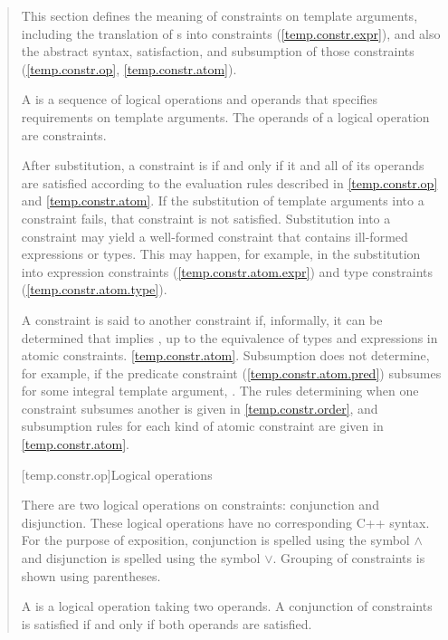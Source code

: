 \begin{quote}

\pnum
\enternote
This section defines the meaning of constraints on template arguments, including
the translation of s
into constraints (\ref{temp.constr.expr}),
and also the abstract syntax, satisfaction, and subsumption of those 
constraints (\ref{temp.constr.op}, \ref{temp.constr.atom}).
\exitnote

\pnum
A  is a sequence of logical operations and 
operands that specifies requirements on template arguments.
\enternote The operands of a logical operation are constraints. \exitnote

\pnum
After substitution, a constraint is  if and only if 
it and all of its operands are satisfied according to the evaluation 
rules described in \ref{temp.constr.op} and \ref{temp.constr.atom}.
% 
If the substitution of template arguments into a constraint fails, 
that constraint is not satisfied.
% 
\enternote
Substitution into a constraint may yield a well-formed constraint that
contains ill-formed expressions or types. This may happen, for
example, in the substitution into expression constraints
(\ref{temp.constr.atom.expr}) and type constraints
(\ref{temp.constr.atom.type}).
\exitnote

\pnum
A constraint  is said to  another constraint  
if, informally, it can be determined that  implies , up to 
the equivalence of types and expressions in atomic constraints.
\ref{temp.constr.atom}. 
% 
\enternote
Subsumption does not determine, for example, if the predicate 
constraint (\ref{temp.constr.atom.pred}) 
 subsumes  for 
some integral template argument, . 
\exitnote
% 
The rules determining when one constraint subsumes another is given
in \ref{temp.constr.order}, and subsumption
rules for each kind of atomic constraint are given in
\ref{temp.constr.atom}.


[temp.constr.op]{Logical operations}

\pnum
There are two logical operations on constraints: conjunction
and disjunction.
% 
\enternote 
These logical operations have no corresponding C++ syntax.
For the purpose of exposition, conjunction is spelled
using the symbol $\land$ and disjunction is spelled using the 
symbol $\lor$. Grouping of constraints is shown using parentheses.
\exitnote

\pnum
A  is a logical operation taking two 
operands. A conjunction of constraints is satisfied if and only 
if both operands are satisfied.


\end{quote}

